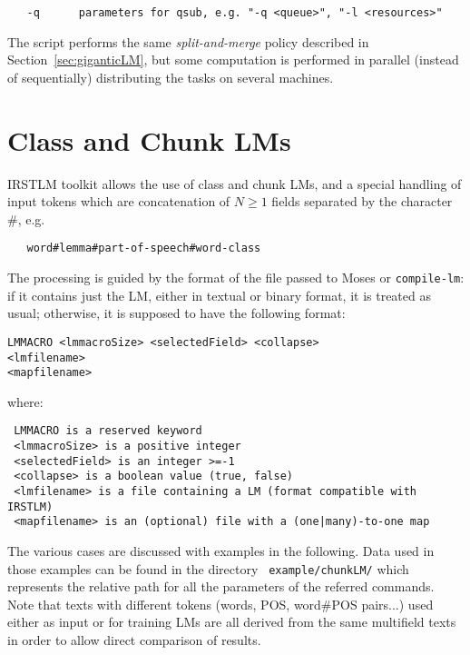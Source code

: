 \documentclass[11pt]{article}
\begin{document}
\begin{verbatim}
   -q      parameters for qsub, e.g. "-q <queue>", "-l <resources>"
\end{verbatim}

\noindent
The script performs the same {\em split-and-merge} policy described in Section~\ref{sec:giganticLM}, but some computation is performed in parallel (instead of sequentially) distributing the tasks on several machines.

\newpage
\section{Class and Chunk LMs}

IRSTLM toolkit allows the use of class and chunk LMs, and a special
handling of input tokens which are concatenation of $N \ge 1$ fields separated
by the character \#, e.g.

\begin{verbatim}
   word#lemma#part-of-speech#word-class
\end{verbatim}

\noindent The processing is guided by the format of the file passed to
Moses or {\tt compile-lm}: if it contains just the LM, either in textual or
binary format, it is treated as usual; otherwise, it is supposed to have
the following format:

\begin{verbatim}
LMMACRO <lmmacroSize> <selectedField> <collapse>
<lmfilename>
<mapfilename>
\end{verbatim}

\noindent where:
\begin{verbatim}
 LMMACRO is a reserved keyword
 <lmmacroSize> is a positive integer
 <selectedField> is an integer >=-1
 <collapse> is a boolean value (true, false)
 <lmfilename> is a file containing a LM (format compatible with IRSTLM)
 <mapfilename> is an (optional) file with a (one|many)-to-one map
\end{verbatim}

\noindent The various cases are discussed with examples in the
following. Data used in those examples can be found in the directory {\tt
example/chunkLM/} which represents the relative path for all the parameters
of the referred commands.  Note that texts with different tokens (words,
POS, word\#POS pairs...) used either as input or for training LMs are all
derived from the same multifield texts in order to allow direct comparison
of results.
\end{document}
